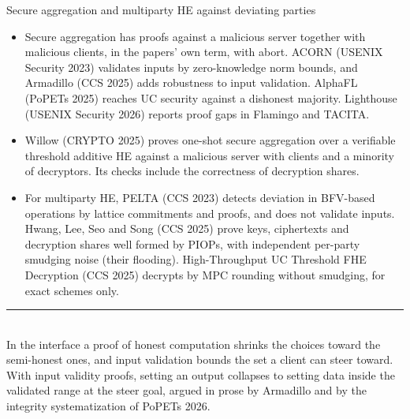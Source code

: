 \documentclass[aspectratio=169,10pt]{beamer}
\newcommand{\redline}{\textcolor{kred}{\rule{\textwidth}{1pt}}}
\begin{document}
\begin{frame}{Secure aggregation and multiparty HE against deviating parties}
  \small
  \begin{itemize}
    \item Secure aggregation has proofs against a malicious server together with malicious clients, in the papers' own term, with abort. ACORN (USENIX Security 2023) validates inputs by zero-knowledge norm bounds, and Armadillo (CCS 2025) adds robustness to input validation. AlphaFL (PoPETs 2025) reaches UC security against a dishonest majority. Lighthouse (USENIX Security 2026) reports proof gaps in Flamingo and TACITA.
    \item Willow (CRYPTO 2025) proves one-shot secure aggregation over a verifiable threshold additive HE against a malicious server with clients and a minority of decryptors. Its checks include the correctness of decryption shares.
    \item For multiparty HE, PELTA (CCS 2023) detects deviation in BFV-based operations by lattice commitments and proofs, and does not validate inputs. Hwang, Lee, Seo and Song (CCS 2025) prove keys, ciphertexts and decryption shares well formed by PIOPs, with independent per-party smudging noise (their flooding). High-Throughput UC Threshold FHE Decryption (CCS 2025) decrypts by MPC rounding without smudging, for exact schemes only.
  \end{itemize}
  \vspace{0.4em}
  \redline\\[0.4em]
  In the interface a proof of honest computation shrinks the choices toward the semi-honest ones, and input validation bounds the set a client can steer toward. With input validity proofs, setting an output collapses to setting data inside the validated range at the steer goal, argued in prose by Armadillo and by the integrity systematization of PoPETs 2026.
\end{frame}
\end{document}
